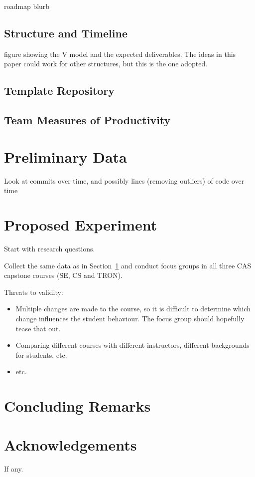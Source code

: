 \documentclass[10pt, conference]{IEEEtran}
\begin{document}
roadmap blurb

\subsection{Structure and Timeline}

figure showing the V model and the expected deliverables.  The ideas in this
paper could work for other structures, but this is the one adopted.

\subsection{Template Repository}

\subsection{Team Measures of Productivity}

\section{Preliminary Data} \label{SecPrelimData}

Look at commits over time, and possibly lines (removing outliers) of code over
time

\section{Proposed Experiment} \label{SecProposedExperiment}

Start with research questions.

Collect the same data as in Section~\ref{SecPrelimData} and conduct focus groups
in all three CAS capstone courses (SE, CS and TRON).  

Threats to validity:

\begin{itemize}
    \item Multiple changes are made to the course, so it is difficult to
    determine which change influences the student behaviour.  The focus group
    should hopefully tease that out.
    \item Comparing different courses with different instructors, different
    backgrounds for students, etc.
    \item etc.
\end{itemize}

\section{Concluding Remarks} \label{SecConclusions}

\section*{Acknowledgements}

If any.



\end{document}
